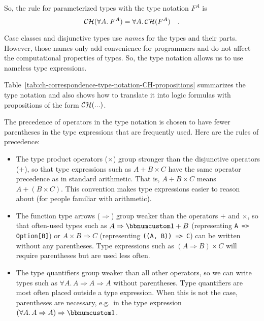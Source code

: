 So, the rule for parameterized types with the type notation $F^{A}$
is
\[
{\cal CH}(\forall A.\:F^{A})=\forall A.\,{\cal CH}(F^{A})\quad.
\]

Case classes and disjunctive types use \emph{names} for the types
and their parts. However, those names only add convenience for programmers
and do not affect the computational properties of types. So, the type
notation allows us to use nameless type expressions.

Table~\ref{tab:ch-correspondence-type-notation-CH-propositions}
summarizes the type notation and also shows how to translate it into
logic formulas with propositions of the form ${\cal CH}(...)$.

The precedence of operators
in the type notation is chosen to have fewer parentheses in the type
expressions that are frequently used. Here are the rules of precedence:
\begin{itemize}
\item The type product operators ($\times$) group stronger than the disjunctive
operators ($+$), so that type expressions such as $A+B\times C$
have the same operator precedence as in standard arithmetic. That
is, $A+B\times C$ means $A+\left(B\times C\right)$. This convention
makes type expressions easier to reason about (for people familiar
with arithmetic).
\item The function type arrows ($\Rightarrow$) group weaker than the operators
$+$ and $\times$, so that often-used types such as $A\Rightarrow\bbnum 1+B$
(representing \lstinline!A => Option[B]!) or $A\times B\Rightarrow C$
(representing \lstinline!((A, B)) => C!) can be written without any
parentheses. Type expressions such as $\left(A\Rightarrow B\right)\times C$
will require parentheses but are used less often.
\item The type quantifiers group weaker than all other operators, so we
can write types such as $\forall A.\,A\Rightarrow A\Rightarrow A$
without parentheses. Type quantifiers are most often placed outside
a type expression. When this is not the case, parentheses are necessary,
e.g.~in the type expression $\left(\forall A.\,A\Rightarrow A\right)\Rightarrow\bbnum 1$.
\end{itemize}
